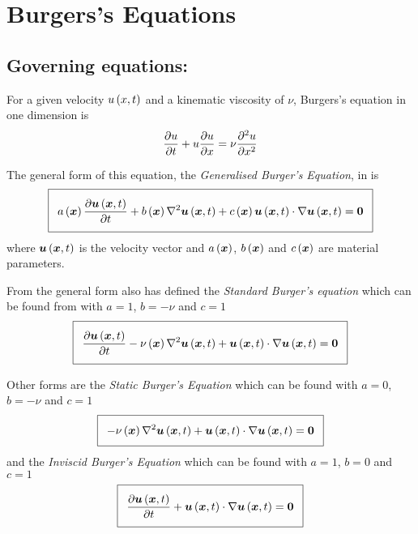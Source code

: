 \section{Burgers's Equations}

\subsection{Governing equations:}

For a given velocity $ u\left( x,t \right) $ and a kinematic viscosity of $\nu$, Burgers's equation
in one dimension is
\begin{equation}
  \delby{u}{t}+u\delby{u}{x}=\nu\deltwosqby{u}{x}
  \label{eqn:BurgersEquation}
\end{equation}

The general form of this equation, the \emph{Generalised Burger's Equation}, in \OpenCMISS is
\begin{equation}
  \addtolength{\fboxsep}{5pt}
  \boxed{
    \fnof{a}{\vectr{x}}\delby{\fnof{\vectr{u}}{\vectr{x},t}}{t}+\fnof{b}{\vectr{x}}\laplacian{}{\fnof{\vectr{u}}{\vectr{x},t}}+
    \fnof{c}{\vectr{x}}\dotprod{\fnof{\vectr{u}}{\vectr{x},t}}{\gradient{}{\fnof{\vectr{u}}{\vectr{x},t}}}=\vectr{0}
  }
  \label{eqn:GeneralFormBurgersEquation}
\end{equation}
where $  \boldsymbol{u} \left(  \boldsymbol{x} ,t \right) $ is the velocity vector and
$ a\left(  \boldsymbol{x}  \right) $, $ b\left(  \boldsymbol{x}  \right) $ and $ c\left(  \boldsymbol{x}  \right) $ are
material parameters.

From the general form \OpenCMISS also has defined the \emph{Standard
Burger's equation} which can be found from
 with $a=1$, $b=-\nu$ and
$c=1$ \ie
\begin{equation}
  \addtolength{\fboxsep}{5pt}
  \boxed{
    \delby{\fnof{\vectr{u}}{\vectr{x},t}}{t}-\fnof{\nu}{\vectr{x}}\laplacian{}{\fnof{\vectr{u}}{\vectr{x},t}}+
    \dotprod{\fnof{\vectr{u}}{\vectr{x},t}}{\gradient{}{\fnof{\vectr{u}}{\vectr{x},t}}}=\vectr{0}
  }
  \label{eqn:StandardFormBurgersEquation}
\end{equation}

Other forms are the \emph{Static Burger's Equation} which can be found
with $a=0$, $b=-\nu$ and $c=1$ \ie
\begin{equation}
  \addtolength{\fboxsep}{5pt}
  \boxed{
    -\fnof{\nu}{\vectr{x}}\laplacian{}{\fnof{\vectr{u}}{\vectr{x},t}}+
    \dotprod{\fnof{\vectr{u}}{\vectr{x},t}}{\gradient{}{\fnof{\vectr{u}}{\vectr{x},t}}}=\vectr{0}
  }
  \label{eqn:StaticFormBurgersEquation}
\end{equation}
and the \emph{Inviscid Burger's Equation} which can be found
with $a=1$, $b=0$ and $c=1$ \ie
\begin{equation}
  \addtolength{\fboxsep}{5pt}
  \boxed{
    \delby{\fnof{\vectr{u}}{\vectr{x},t}}{t}+
    \dotprod{\fnof{\vectr{u}}{\vectr{x},t}}{\gradient{}{\fnof{\vectr{u}}{\vectr{x},t}}}=\vectr{0}
  }
  \label{eqn:InviscidFormBurgersEquation}
\end{equation}

